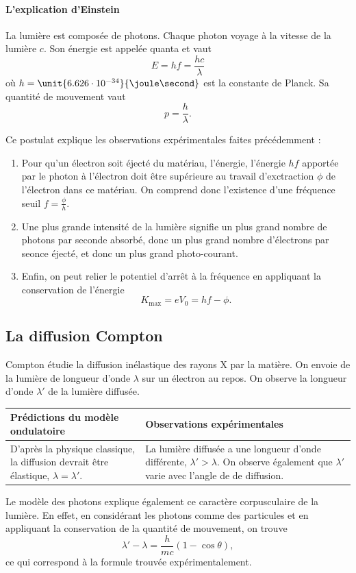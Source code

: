 \paragraph{L'explication d'Einstein}
La lumière est composée de photons.
Chaque photon voyage à la vitesse de la lumière $c$.
Son énergie est appelée quanta et vaut
\[ E = hf = \frac{hc}{\lambda} \]
où $h = \unit{6.626\cdot10^{-34}}{\joule\second}$ est
la constante de Planck. 
Sa quantité de mouvement vaut
\[ p = \frac{h}{\lambda}. \]

Ce postulat explique les observations expérimentales
faites précédemment :
\begin{enumerate}
	\item	Pour qu'un électron soit éjecté du matériau,
	l'énergie, l'énergie $hf$ apportée par le photon à
	l'électron doit être supérieure au travail d'exctraction
	$\phi$ de l'électron dans ce matériau. On comprend donc
	l'existence d'une fréquence seuil $f = \frac{\phi}{h}$.
	\item Une plus grande intensité de la lumière signifie
	un plus grand nombre de photons par seconde absorbé,
	donc un plus grand nombre d'électrons par seonce éjecté,
	et donc un plus grand photo-courant.
	\item Enfin, on peut relier le potentiel d'arrêt à la
	fréquence en appliquant la conservation de l'énergie
	\[ K_{\text{max}} = eV_0 = hf - \phi .\]
\end{enumerate}

\subsection{La diffusion Compton}
Compton étudie la diffusion inélastique des rayons X
par la matière. On envoie de la lumière de longueur d'onde
$\lambda$ sur un électron au repos. On observe la longueur
d'onde $\lambda'$ de la lumière diffusée.

\begin{tabular}{p{}|p{}}
	\textbf{Prédictions du modèle ondulatoire} & \textbf{Observations expérimentales} \\
	\hline
	D'après la physique classique, la diffusion devrait être élastique, $\lambda = \lambda'$.
	& La lumière diffusée a une longueur d'onde différente, $\lambda' > \lambda$. On observe
	également que $\lambda'$ varie avec l'angle de de diffusion.
\end{tabular}

Le modèle des photons explique également ce caractère corpusculaire
de la lumière. En effet, en considérant les photons comme des
particules et en appliquant la conservation de la quantité
de mouvement, on trouve
\[ \lambda' -\lambda = \frac{h}{mc}(1-\cos\theta),\] 
ce qui correspond à la formule trouvée expérimentalement.

